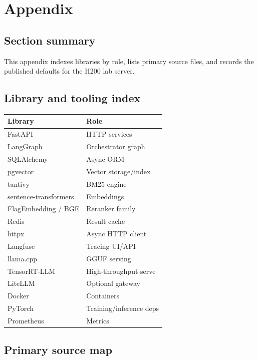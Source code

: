 \chapter{Appendix}\label{appendix}

\section{Section summary}\label{section-summary}

This appendix indexes libraries by role, lists primary source files, and records the published defaults for the H200 lab server.

\section{Library and tooling index}\label{library-and-tooling-index}

\begin{longtable}[]{@{}ll@{}}
\toprule\noalign{}
Library & Role \\
\midrule\noalign{}
\endhead
\bottomrule\noalign{}
\endlastfoot
FastAPI & HTTP services \\
LangGraph & Orchestrator graph \\
SQLAlchemy & Async ORM \\
pgvector & Vector storage/index \\
tantivy & BM25 engine \\
sentence-transformers & Embeddings \\
FlagEmbedding / BGE & Reranker family \\
Redis & Result cache \\
httpx & Async HTTP client \\
Langfuse & Tracing UI/API \\
llama.cpp & GGUF serving \\
TensorRT-LLM & High-throughput serve \\
LiteLLM & Optional gateway \\
Docker & Containers \\
PyTorch & Training/inference deps \\
Prometheus & Metrics \\
\end{longtable}

\section{Primary source map}\label{primary-source-map}

